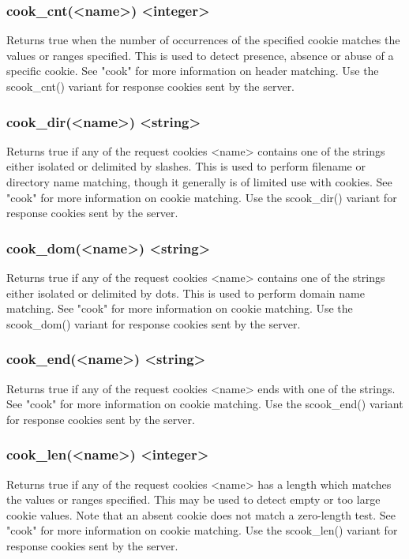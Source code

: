 \subsubsection[cook\_cnt]{cook\_cnt(<name>) <integer>}
  Returns true when the number of occurrences of the specified cookie matches
  the values or ranges specified. This is used to detect presence, absence or
  abuse of a specific cookie. See "cook" for more information on header
  matching. Use the scook\_cnt() variant for response cookies sent by the
  server.

\subsubsection[cook\_dir]{cook\_dir(<name>) <string>}
  Returns true if any of the request cookies <name> contains one of the strings
  either isolated or delimited by slashes. This is used to perform filename or
  directory name matching, though it generally is of limited use with cookies.
  See "cook" for more information on cookie matching. Use the scook\_dir()
  variant for response cookies sent by the server.

\subsubsection[cook\_dom]{cook\_dom(<name>) <string>}
  Returns true if any of the request cookies <name> contains one of the strings
  either isolated or delimited by dots. This is used to perform domain name
  matching. See "cook" for more information on cookie matching. Use the
  scook\_dom() variant for response cookies sent by the server.

\subsubsection[cook\_end]{cook\_end(<name>) <string>}
  Returns true if any of the request cookies <name> ends with one of the
  strings. See "cook" for more information on cookie matching. Use the
  scook\_end() variant for response cookies sent by the server.

\subsubsection[cook\_len]{cook\_len(<name>) <integer>}
  Returns true if any of the request cookies <name> has a length which matches
  the values or ranges specified. This may be used to detect empty or too large
  cookie values. Note that an absent cookie does not match a zero-length test.
  See "cook" for more information on cookie matching. Use the scook\_len()
  variant for response cookies sent by the server.

